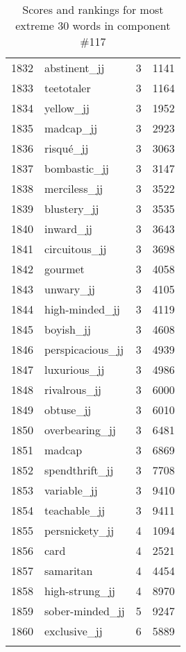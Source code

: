 \begin{longtable}[!htbp]{| rlr@{.}l |}
    1832 & abstinent\_jj & 3 & 1141 \\
    1833 & teetotaler & 3 & 1164 \\
    1834 & yellow\_jj & 3 & 1952 \\
    1835 & madcap\_jj & 3 & 2923 \\
    1836 & risqué\_jj & 3 & 3063 \\
    1837 & bombastic\_jj & 3 & 3147 \\
    1838 & merciless\_jj & 3 & 3522 \\
    1839 & blustery\_jj & 3 & 3535 \\
    1840 & inward\_jj & 3 & 3643 \\
    1841 & circuitous\_jj & 3 & 3698 \\
    1842 & gourmet & 3 & 4058 \\
    1843 & unwary\_jj & 3 & 4105 \\
    1844 & high-minded\_jj & 3 & 4119 \\
    1845 & boyish\_jj & 3 & 4608 \\
    1846 & perspicacious\_jj & 3 & 4939 \\
    1847 & luxurious\_jj & 3 & 4986 \\
    1848 & rivalrous\_jj & 3 & 6000 \\
    1849 & obtuse\_jj & 3 & 6010 \\
    1850 & overbearing\_jj & 3 & 6481 \\
    1851 & madcap & 3 & 6869 \\
    1852 & spendthrift\_jj & 3 & 7708 \\
    1853 & variable\_jj & 3 & 9410 \\
    1854 & teachable\_jj & 3 & 9411 \\
    1855 & persnickety\_jj & 4 & 1094 \\
    1856 & card & 4 & 2521 \\
    1857 & samaritan & 4 & 4454 \\
    1858 & high-strung\_jj & 4 & 8970 \\
    1859 & sober-minded\_jj & 5 & 9247 \\
    1860 & exclusive\_jj & 6 & 5889 \\
    \hline
    \caption{Scores and rankings for most extreme 30 words in component \#117} \\
\end{longtable}
